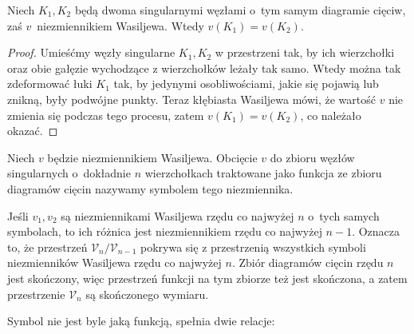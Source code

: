 \begin{proposition}
    Niech $K_1, K_2$ będą dwoma singularnymi węzłami o~tym samym diagramie cięciw, zaś $v$~niezmiennikiem Wasiljewa.
    Wtedy $v(K_1) = v(K_2)$.
\end{proposition}

\begin{proof}
    Umieśćmy węzły singularne $K_1, K_2$ w przestrzeni tak, by ich wierzchołki oraz obie gałęzie wychodzące z wierzchołków leżały tak samo. Wtedy można tak zdeformować łuki $K_1$ tak, by jedynymi osobliwościami, jakie się pojawią lub znikną, były podwójne punkty.
    Teraz kłębiasta Wasiljewa mówi, że wartość $v$ nie zmienia się podczas tego procesu, zatem $v(K_1) = v(K_2)$, co należało okazać.
\end{proof}

\begin{definition}
    Niech $v$ będzie niezmiennikiem Wasiljewa.
    Obcięcie $v$ do zbioru węzłów singularnych o~dokładnie $n$ wierzchołkach traktowane jako funkcja ze zbioru diagramów cięcin nazywamy symbolem tego niezmiennika.
\end{definition}

Jeśli $v_1, v_2$ są niezmiennikami Wasiljewa rzędu co najwyżej $n$ o~tych samych symbolach, to ich różnica jest niezmiennikiem rzędu co najwyżej $n - 1$.
Oznacza to, że przestrzeń $\mathcal V_n/\mathcal V_{n-1}$ pokrywa się z przestrzenią wszystkich symboli niezmienników Wasiljewa rzędu co najwyżej $n$.
Zbiór diagramów cięcin rzędu $n$ jest skończony, więc przestrzeń funkcji na tym zbiorze też jest skończona, a zatem przestrzenie $\mathcal V_n$ są skończonego wymiaru.

Symbol nie jest byle jaką funkcją, spełnia dwie relacje:

